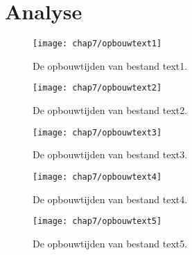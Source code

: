 \chapter{Analyse}
\label{sec:Hoofdstuk 7}

\begin{figure}[h]
	\centering
		\texttt{[image: chap7/opbouwtext1]}
		\caption{De opbouwtijden van bestand text1.}
	\label{fig:opbouwtext1}
\end{figure}

\begin{figure}[h]
	\centering
		\texttt{[image: chap7/opbouwtext2]}
		\caption{De opbouwtijden van bestand text2.}
	\label{fig:opbouwtext2}
\end{figure}

\begin{figure}[h]
	\centering
		\texttt{[image: chap7/opbouwtext3]}
		\caption{De opbouwtijden van bestand text3.}
	\label{fig:opbouwtext3}
\end{figure}

\begin{figure}[h]
	\centering
		\texttt{[image: chap7/opbouwtext4]}
		\caption{De opbouwtijden van bestand text4.}
	\label{fig:opbouwtext4}
\end{figure}

\begin{figure}[h]
	\centering
		\texttt{[image: chap7/opbouwtext5]}
		\caption{De opbouwtijden van bestand text5.}
	\label{fig:opbouwtext5}
\end{figure}
